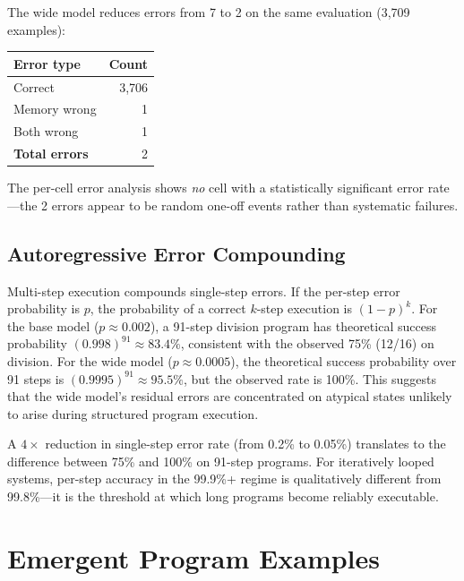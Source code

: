 \documentclass[11pt,a4paper]{article}
\begin{document}
The wide model reduces errors from 7 to 2 on the same evaluation (3{,}709 examples):

\begin{center}
\begin{tabular}{lr}
\toprule
\textbf{Error type} & \textbf{Count} \\
\midrule
Correct & 3{,}706 \\
Memory wrong & 1 \\
Both wrong & 1 \\
\midrule
\textbf{Total errors} & 2 \\
\bottomrule
\end{tabular}
\end{center}

The per-cell error analysis shows \emph{no} cell with a statistically significant error rate---the 2 errors appear to be random one-off events rather than systematic failures.

\subsection{Autoregressive Error Compounding}

Multi-step execution compounds single-step errors.
If the per-step error probability is $p$, the probability of a correct $k$-step execution is $(1-p)^k$.
For the base model ($p \approx 0.002$), a 91-step division program has theoretical success probability $(0.998)^{91} \approx 83.4\%$, consistent with the observed 75\% (12/16) on division.
For the wide model ($p \approx 0.0005$), the theoretical success probability over 91 steps is $(0.9995)^{91} \approx 95.5\%$, but the observed rate is 100\%.
This suggests that the wide model's residual errors are concentrated on atypical states unlikely to arise during structured program execution.

\begin{observation}
A $4\times$ reduction in single-step error rate (from 0.2\% to 0.05\%) translates to the difference between 75\% and 100\% on 91-step programs.
For iteratively looped systems, per-step accuracy in the 99.9\%+ regime is qualitatively different from 99.8\%---it is the threshold at which long programs become reliably executable.
\end{observation}

\section{Emergent Program Examples}
\label{sec:demos}
\end{document}
